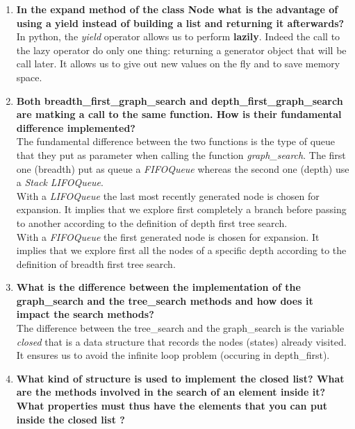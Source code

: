 \documentclass[10pt,a4paper]{article}
\begin{document}
\begin{enumerate}
	
	\item \textbf{In the expand method of the class Node what is the advantage of using a yield instead of building a list and returning it afterwards?} \\
	
	In python, the \textit{yield} operator allows us to perform \textbf{lazily}. Indeed the call to the lazy operator do only one thing: returning a generator object that will be call later. It allows us to give out new values on the fly and to save memory space.\\ 
	
	
	\item \textbf{Both breadth\_first\_graph\_search and depth\_first\_graph\_search are matking a call to the same function. How is their fundamental difference implemented?} \\
	
	The fundamental difference between the two functions is the type of queue that they put as parameter when calling the function \textit{graph\_search}. The first one (breadth) put as queue a \textit{FIFOQueue} whereas the second one (depth) use a \textit{Stack} \textit{LIFOQueue}.\\
	
	With a \textit{LIFOQueue} the last most recently generated node is chosen for expansion. It implies that we explore first completely a branch before passing to another according to the definition of depth first tree search. \\
	
	With a \textit {FIFOQueue} the first generated node is chosen for expansion. It implies that  we explore first all the nodes of a specific depth according to the definition of breadth first tree search.\\
	
	\item \textbf{What is the difference between the implementation of the graph\_search and the tree\_search methods and how does it impact the search methods?}\\
	
	The difference between the tree\_search and the graph\_search is the variable \textit{closed} that is a data structure that records the nodes (states) already visited. It ensures us to avoid the infinite loop problem (occuring in depth\_first). 
	
	\item \textbf{What kind of structure is used to implement the closed list? What are the methods involved in the search of an element inside it? What properties must thus have the elements that you can put inside the closed list ?} \\
	

\end{enumerate}
\end{document}
